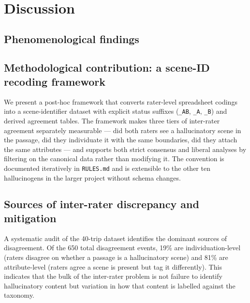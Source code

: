 \section{Discussion}
\label{sec:discussion}


\subsection{Phenomenological findings}

\subsection{Methodological contribution: a scene-ID recoding framework}
We present a post-hoc framework that converts rater-level spreadsheet codings into a scene-identifier dataset with explicit status suffixes (\texttt{\_AB}, \texttt{\_A}, \texttt{\_B}) and derived agreement tables. The framework makes three tiers of inter-rater agreement separately measurable — did both raters see a hallucinatory scene in the passage, did they individuate it with the same boundaries, did they attach the same attributes — and supports both strict consensus and liberal analyses by filtering on the canonical data rather than modifying it. The convention is documented iteratively in \texttt{RULES.md} and is extensible to the other ten hallucinogens in the larger project without schema changes.

\subsection{Sources of inter-rater discrepancy and mitigation}

A systematic audit of the 40-trip dataset identifies the dominant sources of disagreement. Of the 650 total disagreement events, 19\% are individuation-level (raters disagree on whether a passage is a hallucinatory scene) and 81\% are attribute-level (raters agree a scene is present but tag it differently). This indicates that the bulk of the inter-rater problem is not failure to identify hallucinatory content but variation in how that content is labelled against the taxonomy.

